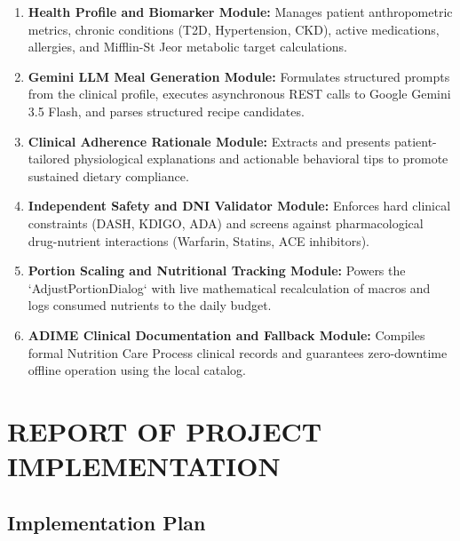 \documentclass[a4paper,12pt]{report}
\begin{document}
\begin{enumerate}
    \item \textbf{Health Profile and Biomarker Module:} Manages patient anthropometric metrics, chronic conditions (T2D, Hypertension, CKD), active medications, allergies, and Mifflin-St Jeor metabolic target calculations.

    \item \textbf{Gemini LLM Meal Generation Module:} Formulates structured prompts from the clinical profile, executes asynchronous REST calls to Google Gemini 3.5 Flash, and parses structured recipe candidates.

    \item \textbf{Clinical Adherence Rationale Module:} Extracts and presents patient-tailored physiological explanations and actionable behavioral tips to promote sustained dietary compliance.

    \item \textbf{Independent Safety and DNI Validator Module:} Enforces hard clinical constraints (DASH, KDIGO, ADA) and screens against pharmacological drug-nutrient interactions (Warfarin, Statins, ACE inhibitors).

    \item \textbf{Portion Scaling and Nutritional Tracking Module:} Powers the `AdjustPortionDialog` with live mathematical recalculation of macros and logs consumed nutrients to the daily budget.

    \item \textbf{ADIME Clinical Documentation and Fallback Module:} Compiles formal Nutrition Care Process clinical records and guarantees zero-downtime offline operation using the local catalog.
\end{enumerate}

\chapter{REPORT OF PROJECT IMPLEMENTATION}

\section{Implementation Plan}
\end{document}
